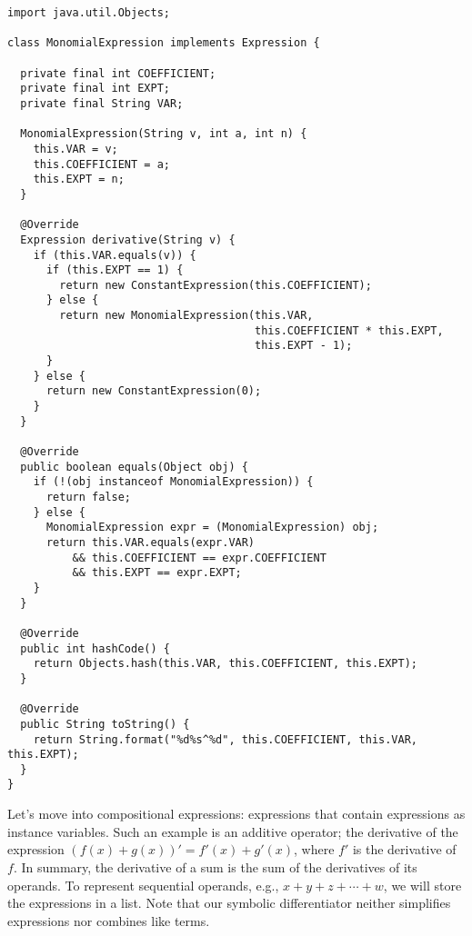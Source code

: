 \begin{lstlisting}[language=MyJava]
import java.util.Objects;

class MonomialExpression implements Expression {

  private final int COEFFICIENT;
  private final int EXPT;
  private final String VAR;

  MonomialExpression(String v, int a, int n) { 
    this.VAR = v;
    this.COEFFICIENT = a;
    this.EXPT = n;
  }

  @Override
  Expression derivative(String v) { 
    if (this.VAR.equals(v)) {
      if (this.EXPT == 1) {
        return new ConstantExpression(this.COEFFICIENT);
      } else {
        return new MonomialExpression(this.VAR, 
                                      this.COEFFICIENT * this.EXPT, 
                                      this.EXPT - 1);
      }
    } else {
      return new ConstantExpression(0);
    } 
  }

  @Override
  public boolean equals(Object obj) {
    if (!(obj instanceof MonomialExpression)) { 
      return false; 
    } else { 
      MonomialExpression expr = (MonomialExpression) obj;
      return this.VAR.equals(expr.VAR)
          && this.COEFFICIENT == expr.COEFFICIENT 
          && this.EXPT == expr.EXPT;
    }
  }

  @Override
  public int hashCode() { 
    return Objects.hash(this.VAR, this.COEFFICIENT, this.EXPT); 
  }

  @Override
  public String toString() { 
    return String.format("%d%s^%d", this.COEFFICIENT, this.VAR, this.EXPT); 
  }
}
\end{lstlisting}

Let's move into compositional expressions: expressions that contain expressions as instance variables. Such an example is an additive operator; the derivative of the expression $(f(x) + g(x))' = f'(x) + g'(x)$, where $f'$ is the derivative of $f$. In summary, the derivative of a sum is the sum of the derivatives of its operands. To represent sequential operands, e.g., $x + y + z + \cdots + w$, we will store the expressions in a list. Note that our symbolic differentiator neither simplifies expressions nor combines like terms.

